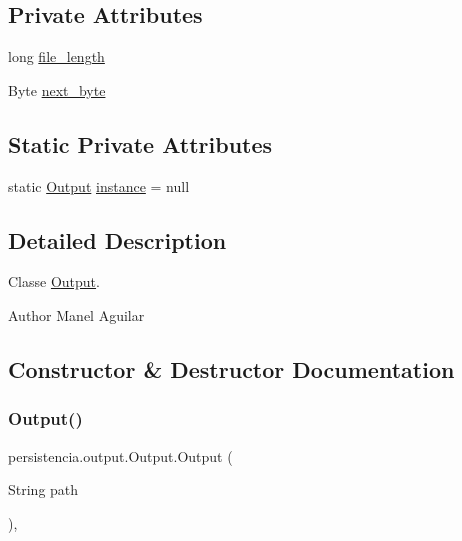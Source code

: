 \subsection*{Private Attributes}
\begin{DoxyCompactItemize}
\item 
long \hyperlink{classpersistencia_1_1output_1_1Output_a028761929614fdc2b88f9ebe0e2313ef}{file\+\_\+length}
\item 
Byte \hyperlink{classpersistencia_1_1output_1_1Output_aca83082ef84ec2e169b6fa34618d0773}{next\+\_\+byte}
\end{DoxyCompactItemize}
\subsection*{Static Private Attributes}
\begin{DoxyCompactItemize}
\item 
static \hyperlink{classpersistencia_1_1output_1_1Output}{Output} \hyperlink{classpersistencia_1_1output_1_1Output_aaadf14a03c4f3f585170abdc7524b63d}{instance} = null
\end{DoxyCompactItemize}


\subsection{Detailed Description}
Classe \hyperlink{classpersistencia_1_1output_1_1Output}{Output}. 

\begin{DoxyAuthor}{Author}
Manel Aguilar 
\end{DoxyAuthor}


\subsection{Constructor \& Destructor Documentation}
\mbox{\label{classpersistencia_1_1output_1_1Output_acbb70ea9eabb2a6d0b2d7bd2f3c9009a}} 
\subsubsection{\texorpdfstring{Output()}{Output()}}
{\footnotesize\ttfamily persistencia.\+output.\+Output.\+Output (\begin{DoxyParamCaption}\item[{String}]{path }\end{DoxyParamCaption})\hspace{0.3cm}{\ttfamily [inline]}, {\ttfamily [private]}}



